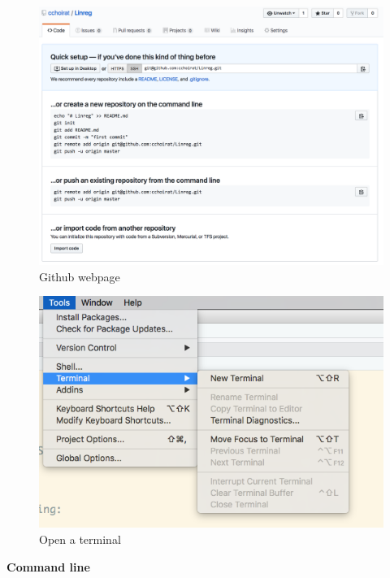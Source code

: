 \documentclass[]{book}
\theoremstyle{definition}
\theoremstyle{definition}
\theoremstyle{definition}
\theoremstyle{remark}
\begin{document}
\begin{figure}

{\centering \includegraphics[width=20.94in]{images/ch3_pkg_7_github} 

}

\caption{Github webpage}\label{fig:pkg7}
\end{figure}

\begin{figure}

{\centering \includegraphics[width=7.85in]{images/ch3_pkg_8_terminal} 

}

\caption{Open a terminal}\label{fig:term}
\end{figure}

\textbf{Command line}
\end{document}
